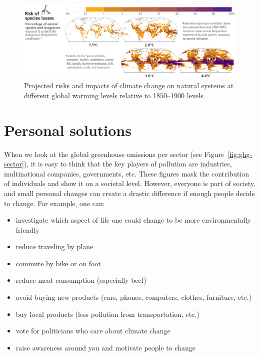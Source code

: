 \documentclass[12pt]{article}
\begin{document}
\begin{figure}[!h]
    \centering
    \includegraphics[width=\linewidth]{Figures/wildlife-loss.png}
    \caption{Projected risks and impacts of climate change on natural systems at different global warming levels relative to 1850–1900 levels. \cite{IPCC-Wildlife-Figure}}
    \label{fig:wildlife}
\end{figure}

\section{Personal solutions}

When we look at the global greenhouse emissions per sector (see Figure~\ref{fig:ghg-sector}), it is easy to think that the key players of pollution are industries, multinational companies, governments, etc. These figures mask the contribution of individuals and show it on a societal level. However, everyone is part of society, and small personal changes can create a drastic difference if enough people decide to change. For example, one can:

\begin{itemize}
    \setlength\itemsep{1pt}
    \item investigate which aspect of life one could change to be more environmentally friendly
    \item reduce traveling by plane
    \item commute by bike or on foot
    \item reduce meat consumption (especially beef)
    \item avoid buying new products (cars, phones, computers, clothes, furniture, etc.)
    \item buy local products (less pollution from transportation, etc.)
    \item vote for politicians who care about climate change
    \item raise awareness around you and motivate people to change
\end{itemize}
\end{document}

